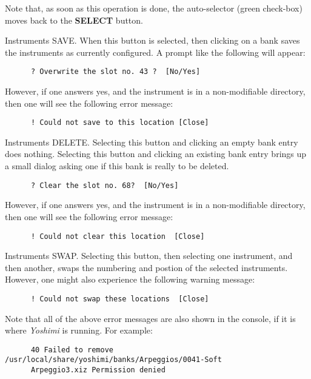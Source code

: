    Note that, as soon as this operation is done, the auto-selector (green
   check-box) moves back to the \textbf{SELECT} button.

   Instruments SAVE.
   When this button is selected, then clicking on a bank saves
   the instruments as currently configured.
   A prompt like the following will appear:

   \begin{verbatim}
      ? Overwrite the slot no. 43 ?  [No/Yes]
   \end{verbatim}

   However, if one answers yes, and the instrument is in a non-modifiable
   directory, then one will see the following error message:

   \begin{verbatim}
      ! Could not save to this location [Close]
   \end{verbatim}

   Instruments DELETE.
   Selecting this button and clicking an empty bank entry does nothing.
   Selecting this button and clicking an existing bank entry brings up a
   small dialog asking one if this bank is really to be deleted.

   \begin{verbatim}
      ? Clear the slot no. 68?  [No/Yes]
   \end{verbatim}

   However, if one answers yes, and the instrument is in a non-modifiable
   directory, then one will see the following error message:

   \begin{verbatim}
      ! Could not clear this location  [Close]
   \end{verbatim}

   Instruments SWAP.
   Selecting this button, then selecting one instrument, and then another,
   swaps the numbering and postion of the selected instruments.
   However, one might also experience the following warning message:

   \begin{verbatim}
      ! Could not swap these locations  [Close]
   \end{verbatim}

   Note that all of the above error messages are also shown in the console, if
   it is where \textsl{Yoshimi} is running.  For example:

   \begin{verbatim}
      40 Failed to remove /usr/local/share/yoshimi/banks/Arpeggios/0041-Soft
      Arpeggio3.xiz Permission denied
   \end{verbatim}

